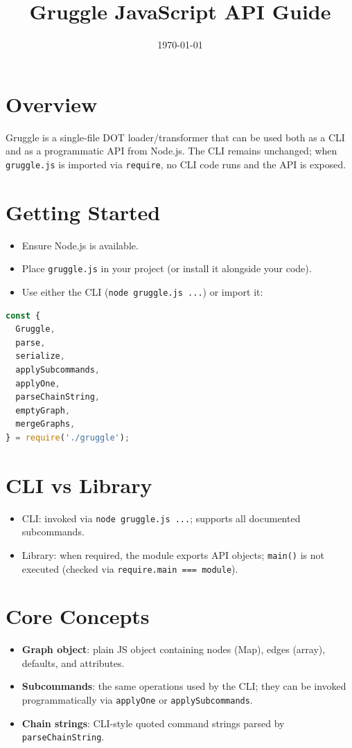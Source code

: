 \documentclass[11pt]{article}
\title{Gruggle JavaScript API Guide}
\author{}
\date{\today}
\begin{document}
\maketitle

\section{Overview}
Gruggle is a single-file DOT loader/transformer that can be used both as a CLI and as a programmatic API from Node.js. The CLI remains unchanged; when \texttt{gruggle.js} is imported via \texttt{require}, no CLI code runs and the API is exposed.

\section{Getting Started}
\begin{itemize}[leftmargin=1.5em]
  \item Ensure Node.js is available.
  \item Place \texttt{gruggle.js} in your project (or install it alongside your code).
  \item Use either the CLI (\texttt{node gruggle.js ...}) or import it:
\end{itemize}
\begin{lstlisting}[language=JavaScript]
const {
  Gruggle,
  parse,
  serialize,
  applySubcommands,
  applyOne,
  parseChainString,
  emptyGraph,
  mergeGraphs,
} = require('./gruggle');
\end{lstlisting}

\section{CLI vs Library}
\begin{itemize}[leftmargin=1.5em]
  \item CLI: invoked via \texttt{node gruggle.js ...}; supports all documented subcommands.
  \item Library: when required, the module exports API objects; \texttt{main()} is not executed (checked via \texttt{require.main === module}).
\end{itemize}

\section{Core Concepts}
\begin{itemize}[leftmargin=1.5em]
  \item \textbf{Graph object}: plain JS object containing nodes (Map), edges (array), defaults, and attributes.
  \item \textbf{Subcommands}: the same operations used by the CLI; they can be invoked programmatically via \texttt{applyOne} or \texttt{applySubcommands}.
  \item \textbf{Chain strings}: CLI-style quoted command strings parsed by \texttt{parseChainString}.
\end{itemize}
\end{document}
